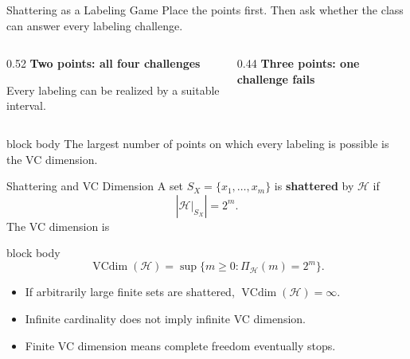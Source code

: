 \documentclass[aspectratio=169,10pt]{beamer}
\newcommand{\Hc}{\mathcal{H}}
\newcommand{\PiH}{\Pi_{\Hc}}
\newcommand{\vcdim}{\operatorname{VCdim}}
\newcommand{\abs}[1]{\left\lvert #1\right\rvert}
\newcommand{\KeyBox}[1]{%
  \begin{beamercolorbox}[rounded=true,sep=0.22cm,wd=\linewidth]{block body}
    #1
  \end{beamercolorbox}%
}
\begin{document}
\begin{frame}[t]{Shattering as a Labeling Game}
  \vspace{0.04cm}\small
  Place the points first. Then ask whether the class can answer every labeling challenge.
  \begin{columns}[T,totalwidth=\textwidth]
    \begin{column}{0.52\textwidth}
      \textbf{Two points: all four challenges}
      \begin{center}
      \end{center}
      Every labeling can be realized by a suitable interval.
    \end{column}
    \begin{column}{0.44\textwidth}
      \textbf{Three points: one challenge fails}
      \begin{center}
      \end{center}
    \end{column}
  \end{columns}
  \KeyBox{The largest number of points on which every labeling is possible is the VC dimension.}
\end{frame}

\begin{frame}[t]{Shattering and VC Dimension}
  \vspace{0.04cm}
  A set $S_X=\{x_1,\ldots,x_m\}$ is \textbf{shattered} by $\Hc$ if
  \[
    \abs{\Hc\vert_{S_X}}=2^m.
  \]
  The VC dimension is
  \begin{beamercolorbox}[rounded=true,sep=0.20cm,wd=\linewidth]{block body}
    \[
      \boxed{
      \vcdim(\Hc)=\sup\{m\ge0:\PiH(m)=2^m\}.}
    \]
  \end{beamercolorbox}
  \vspace{0.15cm}
  \begin{itemize}
    \setlength{\itemsep}{0.10cm}
    \item If arbitrarily large finite sets are shattered, $\vcdim(\Hc)=\infty$.
    \item Infinite cardinality does not imply infinite VC dimension.
    \item Finite VC dimension means complete freedom eventually stops.
  \end{itemize}
\end{frame}
\end{document}
